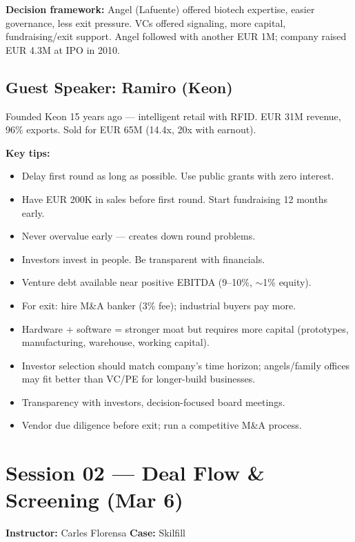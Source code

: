 \documentclass[a4paper,11pt]{article}
\begin{document}
\textbf{Decision framework:} Angel (Lafuente) offered biotech expertise, easier governance, less exit pressure. VCs offered signaling, more capital, fundraising/exit support. Angel followed with another EUR 1M; company raised EUR 4.3M at IPO in 2010.

\subsection{Guest Speaker: Ramiro (Keon)}

Founded Keon 15 years ago --- intelligent retail with RFID. EUR 31M revenue, 96\% exports. Sold for EUR 65M (14.4x, 20x with earnout).

\textbf{Key tips:}
\begin{itemize}
\item Delay first round as long as possible. Use public grants with zero interest.
\item Have EUR 200K in sales before first round. Start fundraising 12 months early.
\item Never overvalue early --- creates down round problems.
\item Investors invest in people. Be transparent with financials.
\item Venture debt available near positive EBITDA (9--10\%, $\sim$1\% equity).
\item For exit: hire M\&A banker (3\% fee); industrial buyers pay more.
\item Hardware + software = stronger moat but requires more capital (prototypes, manufacturing, warehouse, working capital).
\item Investor selection should match company's time horizon; angels/family offices may fit better than VC/PE for longer-build businesses.
\item Transparency with investors, decision-focused board meetings.
\item Vendor due diligence before exit; run a competitive M\&A process.
\end{itemize}

\newpage

\section{Session 02 --- Deal Flow \& Screening (Mar 6)}
\textbf{Instructor:} Carles Florensa \hfill \textbf{Case:} Skilfill
\end{document}
